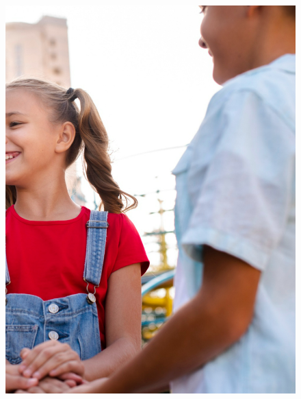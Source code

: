 \begin{figure}[htpb]
\vspace*{-2.5cm}
\hspace{-3cm}\includegraphics[height=\paperheight]{../separadores/separadorPOR5B.png}
\end{figure}




